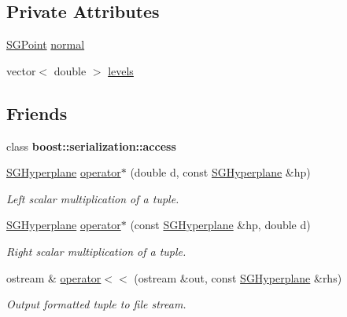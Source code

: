 \subsection*{Private Attributes}
\begin{DoxyCompactItemize}
\item 
\hyperlink{classSGPoint}{S\+G\+Point} \hyperlink{classSGHyperplane_ac5855eb45d21dc29a4770ad335a426e6}{normal}
\item 
vector$<$ double $>$ \hyperlink{classSGHyperplane_a0da64d24816c2d70c84aeaf405035416}{levels}
\end{DoxyCompactItemize}
\subsection*{Friends}
\begin{DoxyCompactItemize}
\item 
\mbox{\label{classSGHyperplane_ac98d07dd8f7b70e16ccb9a01abf56b9c}} 
class {\bfseries boost\+::serialization\+::access}
\item 
\mbox{\label{classSGHyperplane_a93b21e7662e8dfa8780bf805ef59f8ba}} 
\hyperlink{classSGHyperplane}{S\+G\+Hyperplane} \hyperlink{classSGHyperplane_a93b21e7662e8dfa8780bf805ef59f8ba}{operator$\ast$} (double d, const \hyperlink{classSGHyperplane}{S\+G\+Hyperplane} \&hp)
\begin{DoxyCompactList}\small\item\em Left scalar multiplication of a tuple. \end{DoxyCompactList}\item 
\mbox{\label{classSGHyperplane_a7ee3d1e4a61b951d5687af84b06e49e4}} 
\hyperlink{classSGHyperplane}{S\+G\+Hyperplane} \hyperlink{classSGHyperplane_a7ee3d1e4a61b951d5687af84b06e49e4}{operator$\ast$} (const \hyperlink{classSGHyperplane}{S\+G\+Hyperplane} \&hp, double d)
\begin{DoxyCompactList}\small\item\em Right scalar multiplication of a tuple. \end{DoxyCompactList}\item 
\mbox{\label{classSGHyperplane_a2e0ac25ee46e85b3df26d063fccc23cf}} 
ostream \& \hyperlink{classSGHyperplane_a2e0ac25ee46e85b3df26d063fccc23cf}{operator$<$$<$} (ostream \&out, const \hyperlink{classSGHyperplane}{S\+G\+Hyperplane} \&rhs)
\begin{DoxyCompactList}\small\item\em Output formatted tuple to file stream. \end{DoxyCompactList}\end{DoxyCompactItemize}


